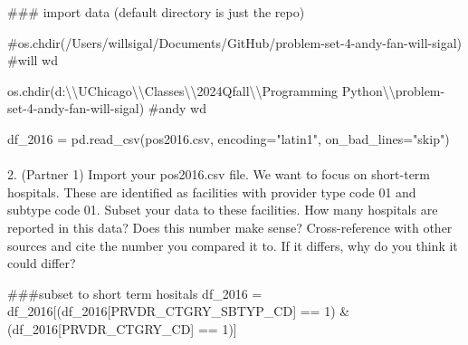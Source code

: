 \documentclass[
  letterpaper,
  DIV=11,
  numbers=noendperiod]{scrartcl}
\makeatletter
\let\oldparagraph\paragraph
\renewcommand{\paragraph}{
    \@ifstar
      \xxxParagraphStar
      \xxxParagraphNoStar
  }
\newcommand{\xxxParagraphStar}[1]{\oldparagraph*{#1}\mbox{}}
\newcommand{\xxxParagraphNoStar}[1]{\oldparagraph{#1}\mbox{}}
\newenvironment{Shaded}{\begin{snugshade}}{\end{snugshade}}
\newcommand{\CharTok}[1]{\textcolor[rgb]{0.13,0.47,0.30}{#1}}
\newcommand{\CommentTok}[1]{\textcolor[rgb]{0.37,0.37,0.37}{#1}}
\newcommand{\DecValTok}[1]{\textcolor[rgb]{0.68,0.00,0.00}{#1}}
\newcommand{\NormalTok}[1]{\textcolor[rgb]{0.00,0.23,0.31}{#1}}
\newcommand{\OperatorTok}[1]{\textcolor[rgb]{0.37,0.37,0.37}{#1}}
\newcommand{\StringTok}[1]{\textcolor[rgb]{0.13,0.47,0.30}{#1}}
\makeatother
\begin{document}
\begin{Shaded}
\begin{Highlighting}[]
\CommentTok{\#\#\# import data (default directory is just the repo)}

\CommentTok{\#os.chdir(\textquotesingle{}/Users/willsigal/Documents/GitHub/problem{-}set{-}4{-}andy{-}fan{-}will{-}sigal\textquotesingle{}) \#will wd}

\NormalTok{os.chdir(}\StringTok{\textquotesingle{}d:}\CharTok{\textbackslash{}\textbackslash{}}\StringTok{UChicago}\CharTok{\textbackslash{}\textbackslash{}}\StringTok{Classes}\CharTok{\textbackslash{}\textbackslash{}}\StringTok{2024Qfall}\CharTok{\textbackslash{}\textbackslash{}}\StringTok{Programming Python}\CharTok{\textbackslash{}\textbackslash{}}\StringTok{problem{-}set{-}4{-}andy{-}fan{-}will{-}sigal\textquotesingle{}}\NormalTok{) }\CommentTok{\#andy wd}

\NormalTok{df\_2016 }\OperatorTok{=}\NormalTok{ pd.read\_csv(}\StringTok{\textquotesingle{}pos2016.csv\textquotesingle{}}\NormalTok{, encoding}\OperatorTok{=}\StringTok{"latin1"}\NormalTok{, on\_bad\_lines}\OperatorTok{=}\StringTok{"skip"}\NormalTok{)}
\end{Highlighting}
\end{Shaded}

\paragraph{2. (Partner 1) Import your pos2016.csv file. We want to focus
on short-term hospitals. These are identified as facilities with
provider type code 01 and subtype code 01. Subset your data to these
facilities. How many hospitals are reported in this data? Does this
number make sense? Cross-reference with other sources and cite the
number you compared it to. If it differs, why do you think it could
differ?}\label{partner-1-import-your-pos2016.csv-file.-we-want-to-focus-on-short-term-hospitals.-these-are-identified-as-facilities-with-provider-type-code-01-and-subtype-code-01.-subset-your-data-to-these-facilities.-how-many-hospitals-are-reported-in-this-data-does-this-number-make-sense-cross-reference-with-other-sources-and-cite-the-number-you-compared-it-to.-if-it-differs-why-do-you-think-it-could-differ}

\begin{Shaded}
\begin{Highlighting}[]
\CommentTok{\#\#\#subset to short term hositals}
\NormalTok{df\_2016 }\OperatorTok{=}\NormalTok{ df\_2016[(df\_2016[}\StringTok{\textquotesingle{}PRVDR\_CTGRY\_SBTYP\_CD\textquotesingle{}}\NormalTok{] }\OperatorTok{==} \DecValTok{1}\NormalTok{) }\OperatorTok{\&}\NormalTok{ (df\_2016[}\StringTok{\textquotesingle{}PRVDR\_CTGRY\_CD\textquotesingle{}}\NormalTok{] }\OperatorTok{==} \DecValTok{1}\NormalTok{)]}
\end{Highlighting}
\end{Shaded}
\end{document}
